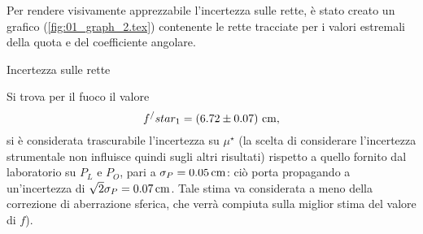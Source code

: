 Per rendere visivamente apprezzabile l'incertezza sulle rette, \`e stato creato un grafico (\autoref{fig:01_graph_2.tex}) contenente le rette tracciate per i valori estremali della quota e del coefficiente angolare.
\begin{grafico} \centering  \caption{Incertezza sulle rette} \label{fig:01_graph_2.tex} \end{grafico}

Si trova per il fuoco il valore 
\[ f^/star_1=\left(6.72 \pm 0.07\right) \,\mathrm{cm} , \] 
si \`e considerata trascurabile l'incertezza su $\mu^{\star}$ (la scelta di considerare l'incertezza strumentale non influisce quindi sugli altri risultati) rispetto a quello fornito dal laboratorio su $P_L$ e $P_O$, pari a $\sigma _P = 0.05 \,\mathrm{cm}$: ci\`o porta propagando a un'incertezza di $\sqrt{2}   \sigma_P = 0.07 \,\mathrm{cm}$. Tale stima va considerata a meno della correzione di aberrazione sferica, che verr\`a compiuta sulla miglior stima del valore di $f$).

